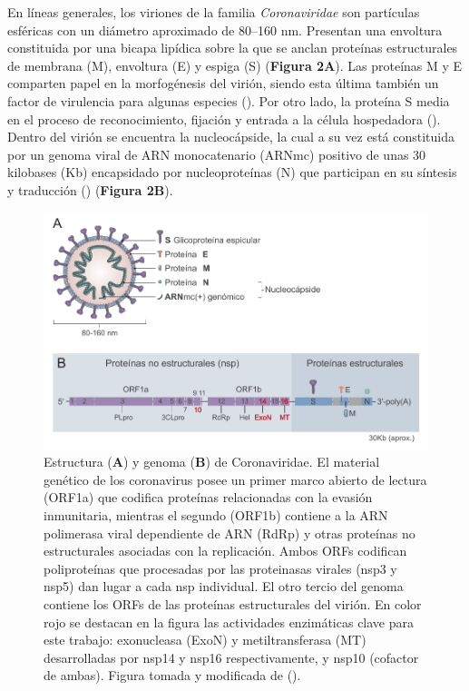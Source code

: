 En líneas generales, los viriones de la familia \textit{Coronaviridae} son 
partículas esféricas con un diámetro aproximado de 80--160 nm. Presentan una 
envoltura constituida por una bicapa lipídica sobre la que se anclan 
proteínas estructurales de membrana (M), envoltura (E) y espiga (S) 
(\textbf{Figura 2A}). Las proteínas M y E comparten papel en la morfogénesis
del virión, siendo esta última también un factor de virulencia para algunas 
especies (\cite{jimenez-guardeno_pdz-binding_2014,neuman_structural_2011,ye_role_2007}). 
Por otro lado, la proteína S media en el proceso de reconocimiento, 
fijación y entrada a la célula hospedadora (\cite{bosch_coronavirus_2003}). 
Dentro del virión se encuentra la nucleocápside, la cual a su vez está 
constituida por un genoma viral de ARN monocatenario (ARNmc) positivo de 
unas 30 kilobases (Kb) encapsidado por nucleoproteínas (N) que participan en
su síntesis y traducción (\cite{enjuanes_biochemical_2006}) 
(\textbf{Figura 2B}).

\begin{figure}[!ht]
    \centering
    \includegraphics[width=1\textwidth]{img/fig2.pdf}
    \caption{Estructura (\textbf{A}) y genoma (\textbf{B}) de Coronaviridae. 
    El material genético de los coronavirus posee un primer marco abierto 
    de lectura (ORF1a) que codifica proteínas relacionadas con la evasión 
    inmunitaria, mientras el segundo (ORF1b) contiene a la ARN polimerasa 
    viral dependiente de ARN (RdRp) y otras proteínas no estructurales 
    asociadas con la replicación. Ambos ORFs codifican poliproteínas que 
    procesadas por las proteinasas virales (nsp3 y nsp5) dan lugar a cada 
    nsp individual. El otro tercio del genoma contiene los ORFs de las 
    proteínas estructurales del virión. En color rojo se destacan en la 
    figura las actividades enzimáticas clave para este trabajo: exonucleasa 
    (ExoN) y metiltransferasa (MT) desarrolladas por nsp14 y nsp16 
    respectivamente, y nsp10 (cofactor de ambas). Figura tomada y modificada 
    de (\cite{asensio_estructura_2020}).}\label{fig:genome_structure}
\end{figure}


